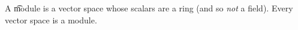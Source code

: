 

A \t{module} is a vector space whose scalars are a ring (and so \textit{not} a field).
Every vector space is a module.

\blankpage
